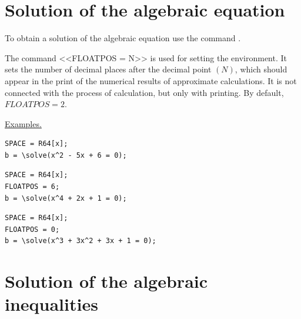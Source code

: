 \section{Solution of the algebraic equation}  
 
To obtain a solution of the algebraic equation use the command  .

 The command <<FLOATPOS = N>> is used for setting the environment. It sets the number of decimal places after the decimal point $ (N) $, which should appear in the print of the numerical results of approximate calculations. It is not connected with the process of calculation, but only with printing. By default, $ FLOATPOS = 2 $.

\underline{Examples. }

\vspace*{-2mm}
\begin{verbatim}
SPACE = R64[x];
b = \solve(x^2 - 5x + 6 = 0);
\end{verbatim}


\begin{verbatim}
SPACE = R64[x];
FLOATPOS = 6;
b = \solve(x^4 + 2x + 1 = 0);
\end{verbatim}


\begin{verbatim}
SPACE = R64[x];
FLOATPOS = 0;
b = \solve(x^3 + 3x^2 + 3x + 1 = 0);
\end{verbatim}


\section{Solution of the algebraic inequalities}

